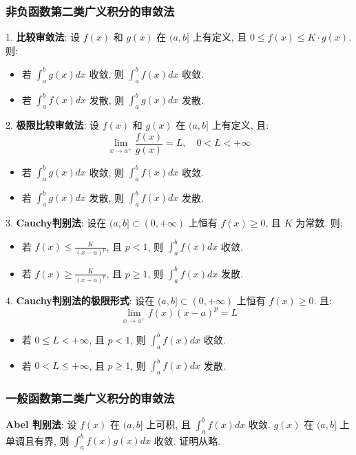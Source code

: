 \documentclass[a4paper,12pt]{ctexart}
\begin{document}
\subsubsection{非负函数第二类广义积分的审敛法}

1. \textbf{比较审敛法}: 设 $f(x)$ 和 $g(x)$ 在 $(a,b]$ 上有定义, 且 $0 \le f(x) \le K \cdot g(x)$. 则:
\begin{itemize}
    \item 若 $\int_a^{b} g(x) dx$ 收敛, 则 $\int_a^{b} f(x) dx$ 收敛.
    \item 若 $\int_a^{b} f(x) dx$ 发散, 则 $\int_a^{b} g(x) dx$ 发散.
\end{itemize}

2. \textbf{极限比较审敛法}: 设 $f(x)$ 和 $g(x)$ 在 $(a,b]$ 上有定义, 且:
$$
\lim_{x \to a^+} \frac{f(x)}{g(x)} = L, \quad 0 < L < +\infty
$$
\begin{itemize}
    \item 若 $\int_a^{b} g(x) dx$ 收敛, 则 $\int_a^{b} f(x) dx$ 收敛.
    \item 若 $\int_a^{b} g(x) dx$ 发散, 则 $\int_a^{b} f(x) dx$ 发散.
\end{itemize}

3. \textbf{Cauchy判别法}: 设在 $(a, b] \subset (0, +\infty)$ 上恒有 $f(x) \ge 0$, 且 $K$ 为常数. 则:
\begin{itemize}
    \item 若 $f(x) \leq \frac{K}{(x-a)^p}$, 且 $p<1$, 则 $\int_a^{b} f(x) dx$ 收敛.
    \item 若 $f(x) \geq \frac{K}{(x-a)^p}$, 且 $p \geq 1$, 则 $\int_a^{b} f(x) dx$ 发散.
\end{itemize}

4. \textbf{Cauchy判别法的极限形式}: 设在 $(a, b] \subset (0, +\infty)$ 上恒有 $f(x) \ge 0$. 且:
$$
\lim_{x \to a^+} f(x) (x-a)^p = L
$$
\begin{itemize}
    \item 若 $0 \leq L < +\infty$, 且 $p<1$, 则 $\int_a^{b} f(x) dx$ 收敛.
    \item 若 $0 < L \leq +\infty$, 且 $p \geq 1$, 则 $\int_a^{b} f(x) dx$ 发散.
\end{itemize}

\subsubsection{一般函数第二类广义积分的审敛法}

\textbf{Abel 判别法}: 设 $f(x)$ 在 $(a,b]$ 上可积, 且 $\int_a^{b} f(x) dx$ 收敛. $g(x)$ 在 $(a,b]$ 上单调且有界, 则 $\int_a^{b} f(x)g(x) dx$ 收敛. 证明从略.
\end{document}
